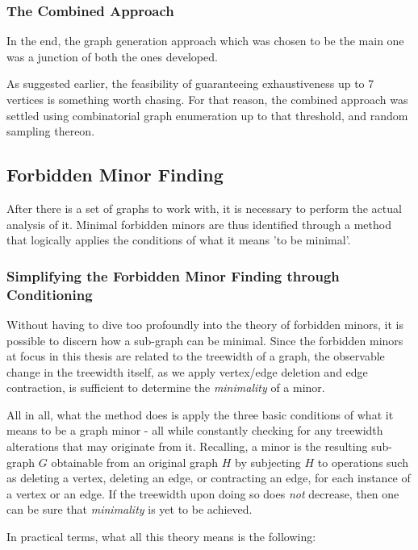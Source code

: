 \subsubsection{The Combined Approach}
In the end, the graph generation approach which was chosen to be the main one was a junction of both the ones developed.

As suggested earlier, the feasibility of guaranteeing exhaustiveness up to 7 vertices is something worth chasing. For that reason, the combined approach was settled using combinatorial graph enumeration up to that threshold, and random sampling thereon.

\subsection{Forbidden Minor Finding}
After there is a set of graphs to work with, it is necessary to perform the actual analysis of it. Minimal forbidden minors are thus identified through a method that logically applies the conditions of what it means 'to be minimal'.

\subsubsection{Simplifying the Forbidden Minor Finding through Conditioning}
Without having to dive too profoundly into the theory of forbidden minors, it is possible to discern how a sub-graph can be minimal. Since the forbidden minors at focus in this thesis are related to the treewidth of a graph, the observable change in the treewidth itself, as we apply vertex/edge deletion and edge contraction, is sufficient to determine the \textit{minimality} of a minor.

All in all, what the method does is apply the three basic conditions of what it means to be a graph minor - all while constantly checking for any treewidth alterations that may originate from it. Recalling, a minor is the resulting sub-graph $G$ obtainable from an original graph $H$ by subjecting $H$ to operations such as deleting a vertex, deleting an edge, or contracting an edge, for each instance of a vertex or an edge. If the treewidth upon doing so does \textit{not} decrease, then one can be sure that \textit{minimality} is yet to be achieved.

In practical terms, what all this theory means is the following: 

